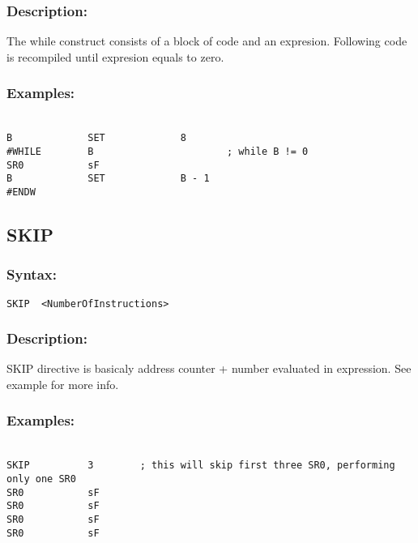         \subsubsection{Description:}
        The while construct consists of a block of code and an expresion. Following code is recompiled until expresion equals to zero.

        \subsubsection{Examples:}
        {
                ~\\
                \usecodefont
                \verb'B             SET             8'\\
                \verb'#WHILE        B                       ; while B != 0'\\
                \verb'SR0           sF'\\
                \verb'B             SET             B - 1'\\
                \verb'#ENDW'
        }

    \subsection{SKIP}
        \subsubsection{Syntax:}
            \verb'SKIP  <NumberOfInstructions>'

        \subsubsection{Description:}
            SKIP directive is basicaly address counter + number evaluated in expression. See example for more info.

        \subsubsection{Examples:}
        {
            ~\\
            \usecodefont
            \verb'SKIP          3        ; this will skip first three SR0, performing only one SR0'\\
            \verb'SR0           sF'\\
            \verb'SR0           sF'\\
            \verb'SR0           sF'\\
            \verb'SR0           sF'\\
        }

